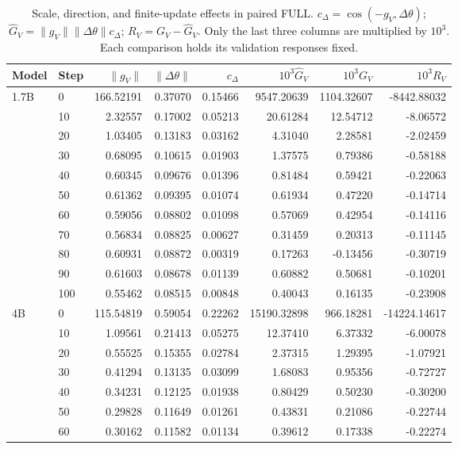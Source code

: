 \begin{table}[!htbp]
\centering
\caption{Scale, direction, and finite-update effects in paired FULL. $c_\Delta=\cos(-g_V,\Delta\theta)$; $\widehat G_V=\|g_V\|\|\Delta\theta\|c_\Delta$; $R_V=G_V-\widehat G_V$. Only the last three columns are multiplied by $10^3$. Each comparison holds its validation responses fixed.}
\label{tab:gain_factors}
\small\setlength{\tabcolsep}{6pt}
\begin{tabular}{llrrrrrr}
\toprule
Model & Step & $\|g_V\|$ & $\|\Delta\theta\|$ & $c_\Delta$ & $10^3\widehat G_V$ & $10^3G_V$ & $10^3R_V$ \\
\midrule
\multirow{11}{*}{1.7B} & 0 & 166.52191 & 0.37070 & 0.15466 & 9547.20639 & 1104.32607 & -8442.88032 \\
 & 10 & 2.32557 & 0.17002 & 0.05213 & 20.61284 & 12.54712 & -8.06572 \\
 & 20 & 1.03405 & 0.13183 & 0.03162 & 4.31040 & 2.28581 & -2.02459 \\
 & 30 & 0.68095 & 0.10615 & 0.01903 & 1.37575 & 0.79386 & -0.58188 \\
 & 40 & 0.60345 & 0.09676 & 0.01396 & 0.81484 & 0.59421 & -0.22063 \\
 & 50 & 0.61362 & 0.09395 & 0.01074 & 0.61934 & 0.47220 & -0.14714 \\
 & 60 & 0.59056 & 0.08802 & 0.01098 & 0.57069 & 0.42954 & -0.14116 \\
 & 70 & 0.56834 & 0.08825 & 0.00627 & 0.31459 & 0.20313 & -0.11145 \\
 & 80 & 0.60931 & 0.08872 & 0.00319 & 0.17263 & -0.13456 & -0.30719 \\
 & 90 & 0.61603 & 0.08678 & 0.01139 & 0.60882 & 0.50681 & -0.10201 \\
 & 100 & 0.55462 & 0.08515 & 0.00848 & 0.40043 & 0.16135 & -0.23908 \\
\midrule
\multirow{11}{*}{4B} & 0 & 115.54819 & 0.59054 & 0.22262 & 15190.32898 & 966.18281 & -14224.14617 \\
 & 10 & 1.09561 & 0.21413 & 0.05275 & 12.37410 & 6.37332 & -6.00078 \\
 & 20 & 0.55525 & 0.15355 & 0.02784 & 2.37315 & 1.29395 & -1.07921 \\
 & 30 & 0.41294 & 0.13135 & 0.03099 & 1.68083 & 0.95356 & -0.72727 \\
 & 40 & 0.34231 & 0.12125 & 0.01938 & 0.80429 & 0.50230 & -0.30200 \\
 & 50 & 0.29828 & 0.11649 & 0.01261 & 0.43831 & 0.21086 & -0.22744 \\
 & 60 & 0.30162 & 0.11582 & 0.01134 & 0.39612 & 0.17338 & -0.22274 \\

\end{tabular}
\end{table}

